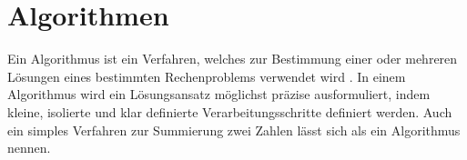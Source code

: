 \section{Algorithmen}

Ein Algorithmus ist ein Verfahren, welches zur Bestimmung einer oder mehreren Lösungen eines bestimmten Rechenproblems verwendet wird \autocite[1]{knebl_algorithmen_2021}. In einem Algorithmus wird ein Lösungsansatz möglichst präzise ausformuliert, indem kleine, isolierte und klar definierte Verarbeitungsschritte definiert werden. Auch ein simples Verfahren zur Summierung zwei Zahlen lässt sich als ein Algorithmus nennen. \autocite[9-10]{hubwieser_fundamente_2015}